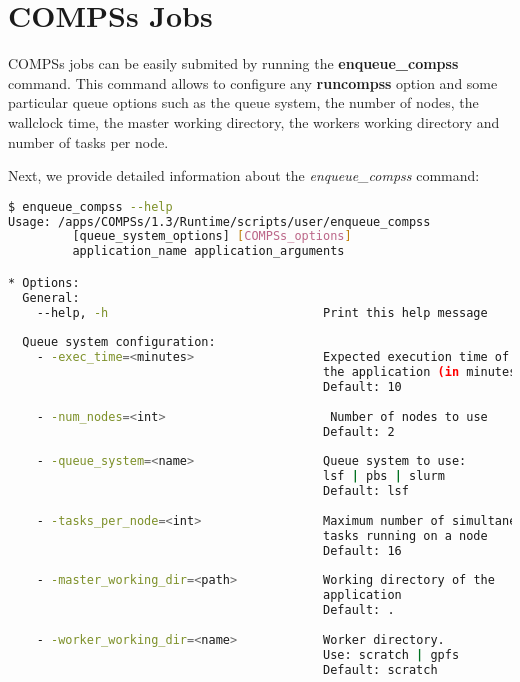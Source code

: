 \section{COMPSs Jobs}
\label{sec:Jobs}

COMPSs jobs can be easily submited by running the \textbf{enqueue\_compss} command. This command allows to configure any 
\textbf{runcompss} option and some particular queue options such as the queue system, the number of nodes, the wallclock time,
the master working directory, the workers working directory and number of tasks per node.

Next, we provide detailed information about the \textit{enqueue\_compss} command:
\begin{lstlisting}[language=bash]
$ enqueue_compss --help
Usage: /apps/COMPSs/1.3/Runtime/scripts/user/enqueue_compss 
         [queue_system_options] [COMPSs_options] 
         application_name application_arguments

* Options:
  General:
    --help, -h                              Print this help message
  
  Queue system configuration:
    - -exec_time=<minutes>                  Expected execution time of 
                                            the application (in minutes)
                                            Default: 10
                                            
    - -num_nodes=<int>                       Number of nodes to use
                                            Default: 2
                                            
    - -queue_system=<name>                  Queue system to use: 
                                            lsf | pbs | slurm
                                            Default: lsf
                                            
    - -tasks_per_node=<int>                 Maximum number of simultaneous
                                            tasks running on a node
                                            Default: 16
                                            
    - -master_working_dir=<path>            Working directory of the 
                                            application
                                            Default: .
                                            
    - -worker_working_dir=<name>            Worker directory. 
                                            Use: scratch | gpfs
                                            Default: scratch
                                            

\end{lstlisting}

